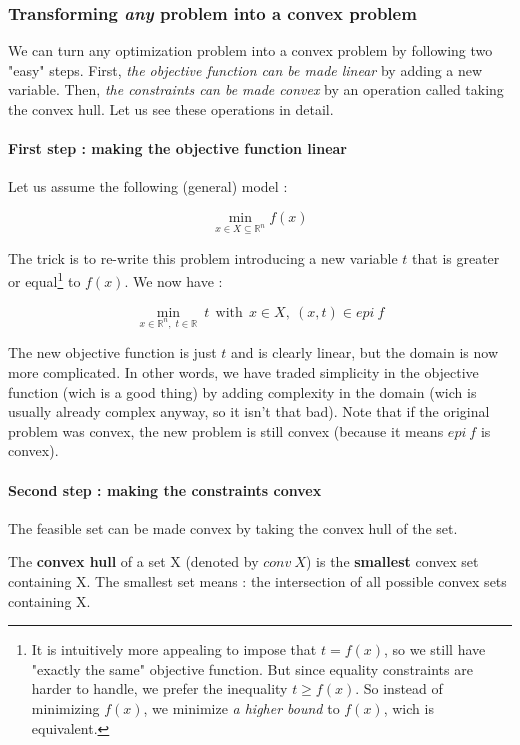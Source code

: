 \subsubsection{Transforming \textit{any} problem into a convex problem}
We can turn any optimization problem into a convex problem by following two "easy" steps. First, \textit{the objective function can be made linear} by adding a new variable. Then, \textit{the constraints can be made convex} by an operation called taking the convex hull. Let us see these operations in detail.

\paragraph{First step : making the objective function linear}
Let us assume the following (general) model :

$$\min_{x \in X \subseteq \mathbb{R}^n} f(x)$$

The trick is to re-write this problem introducing a new variable $t$ that is greater or equal\footnote{It is intuitively more appealing to impose that $t = f(x)$, so we still have "exactly the same" objective function. But since equality constraints are harder to handle, we prefer the inequality $t \geq f(x)$. So instead of minimizing $f(x)$, we minimize \textit{a higher bound} to $f(x)$, wich is equivalent.} to $f(x)$.  We now have :

$$\min_{x \in \mathbb{R}^n, \; t \in \mathbb{R}} \: t \: \: \mathrm{with} \: \: x \in X, \: (x,t) \in epi \: f$$

The new objective function is just $t$ and is clearly linear, but the domain is now more complicated. In other words, we have traded simplicity in the objective function (wich is a good thing) by adding complexity in the domain (wich is usually already complex anyway, so it isn't that bad). Note that if the original problem was convex, the new problem is still convex (because it means $epi \: f$ is convex).

\paragraph{Second step : making the constraints convex}
The feasible set can be made convex by taking the convex hull of the set.\\

\begin{definition}
The \textbf{convex hull} of a set X (denoted by $conv \: X$) is the \textbf{smallest} convex set containing X. The smallest set means : the intersection of all possible convex sets containing X.
\end{definition}

